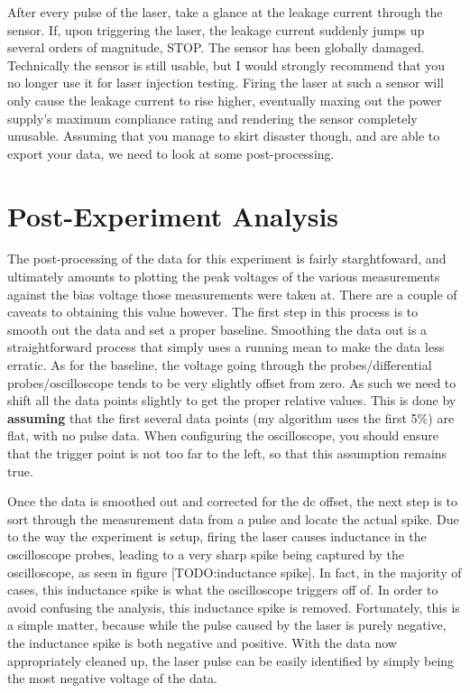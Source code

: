 \documentclass{report}
\begin{document}
            After every pulse of the laser, take a glance at the leakage current through the sensor. If, upon triggering the laser, the leakage current suddenly jumps up several orders of magnitude, STOP. The sensor has been globally damaged. Technically the sensor is still usable, but I would strongly recommend that you no longer use it for laser injection testing. Firing the laser at such a sensor will only cause the leakage current to rise higher, eventually maxing out the power supply's maximum compliance rating and rendering the sensor completely unusable. Assuming that you manage to skirt disaster though, and are able to export your data, we need to look at some post-processing.

        \section{ Post-Experiment Analysis }
            The post-processing of the data for this experiment is fairly starghtfoward, and ultimately amounts to plotting the peak voltages of the various measurements against the bias voltage those measurements were taken at. There are a couple of caveats to obtaining this value however. The first step in this process is to smooth out the data and set a proper baseline. Smoothing the data out is a straightforward process that simply uses a running mean to make the data less erratic. As for the baseline, the voltage going through the probes/differential probes/oscilloscope tends to be very slightly offset from zero. As such we need to shift all the data points slightly to get the proper relative values. This is done by \textbf{assuming} that the first several data points (my algorithm uses the first 5\%) are flat, with no pulse data. When configuring the oscilloscope, you should ensure that the trigger point is not too far to the left, so that this assumption remains true.
            

            Once the data is smoothed out and corrected for the dc offset, the next step is to sort through the measurement data from a pulse and locate the actual spike. Due to the way the experiment is setup, firing the laser causes inductance in the oscilloscope probes, leading to a very sharp spike being captured by the oscilloscope, as seen in figure [TODO:inductance spike]. In fact, in the majority of cases, this inductance spike is what the oscilloscope triggers off of. In order to avoid confusing the analysis, this inductance spike is removed. Fortunately, this is a simple matter, because while the pulse caused by the laser is purely negative, the inductance spike is both negative and positive. With the data now appropriately cleaned up, the laser pulse can be easily identified by simply being the most negative voltage of the data.
\end{document}
